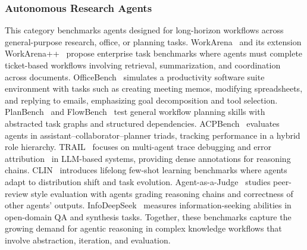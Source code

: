 \subsubsection{Autonomous Research Agents}
This category benchmarks agents designed for long-horizon workflows across general-purpose research, office, or planning tasks. WorkArena~\cite{alexandre2024workarena} and its extension WorkArena++~\cite{leo2024workarena} propose enterprise task benchmarks where agents must complete ticket-based workflows involving retrieval, summarization, and coordination across documents. OfficeBench~\cite{zilong2024officebench} simulates a productivity software suite environment with tasks such as creating meeting memos, modifying spreadsheets, and replying to emails, emphasizing goal decomposition and tool selection. PlanBench~\cite{valmeekam2023planbench} and FlowBench~\cite{xiao2024flowbench} test general workflow planning skills with abstracted task graphs and structured dependencies. ACPBench~\cite{kokel2025acpbench} evaluates agents in assistant–collaborator–planner triads, tracking performance in a hybrid role hierarchy. TRAIL~\cite{darshan2025trail} focuses on multi-agent trace debugging and error attribution~\cite{zhang2024knowledge} in LLM-based systems, providing dense annotations for reasoning chains. CLIN~\cite{bodhisattwa2023clin} introduces lifelong few-shot learning benchmarks where agents adapt to distribution shift and task evolution. Agent-as-a-Judge~\cite{mingchen2024agentasajudge} studies peer-review style evaluation with agents grading reasoning chains and correctness of other agents’ outputs. InfoDeepSeek~\cite{xi2025infodeepseek} measures information-seeking abilities in open-domain QA and synthesis tasks. Together, these benchmarks capture the growing demand for agentic reasoning in complex knowledge workflows that involve abstraction, iteration, and evaluation.

